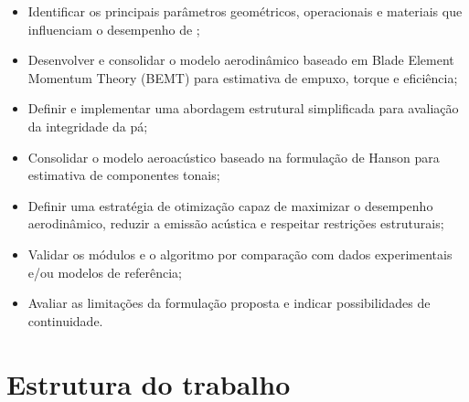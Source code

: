\begin{itemize}[leftmargin=*]
    \item Identificar os principais parâmetros geométricos, operacionais e materiais que influenciam o desempenho de \propellers;
    \item Desenvolver e consolidar o modelo aerodinâmico baseado em Blade Element Momentum Theory (BEMT) para estimativa de empuxo, torque e eficiência;
    \item Definir e implementar uma abordagem estrutural simplificada para avaliação da integridade da pá;
    \item Consolidar o modelo aeroacústico baseado na formulação de Hanson para estimativa de componentes tonais;
    \item Definir uma estratégia de otimização capaz de maximizar o desempenho aerodinâmico, reduzir a emissão acústica e respeitar restrições estruturais;
    \item Validar os módulos e o algoritmo por comparação com dados experimentais e/ou modelos de referência;
    \item Avaliar as limitações da formulação proposta e indicar possibilidades de continuidade.
\end{itemize}

\section{Estrutura do trabalho}
\label{sec:estrutura_trabalho}

